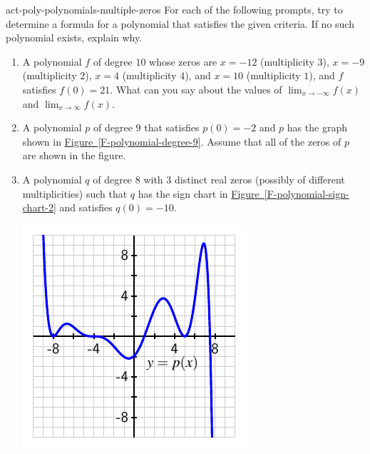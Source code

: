\documentclass{ximera}
\begin{document}
\begin{exploration}{}{act-poly-polynomials-multiple-zeros}%
For each of the following prompts, try to determine a formula for a polynomial that satisfies the given criteria.  If no such polynomial exists, explain why.%

\begin{enumerate}[label=\alph*.]
\item A polynomial $f$ of degree $10$ whose zeros are $x = -12$ (multiplicity $3$), $x = -9$ (multiplicity $2$), $x = 4$ (multiplicity $4$), and $x = 10$ (multiplicity $1$), and $f$ satisfies $f(0) = 21$.  What can you say about the values of $\lim_{x \to -\infty} f(x)$ and $\lim_{x \to \infty} f(x)$.%
\item A polynomial $p$ of degree $9$ that satisfies $p(0) = -2$ and $p$ has the graph shown in \hyperref[F-polynomial-degree-9]{Figure~\ref{F-polynomial-degree-9}}.  Assume that all of the zeros of $p$ are shown in the figure.%
\item A polynomial $q$ of degree $8$ with $3$ distinct real zeros (possibly of different multiplicities) such that $q$ has the sign chart in \hyperref[F-polynomial-sign-chart-2]{Figure~\ref{F-polynomial-sign-chart-2}} and satisfies $q(0) = -10$.%
\begin{image}
\includegraphics[width=1\linewidth]{images/poly-degree-9.pdf}

\end{image}
\end{enumerate}
\end{exploration}
\end{document}
